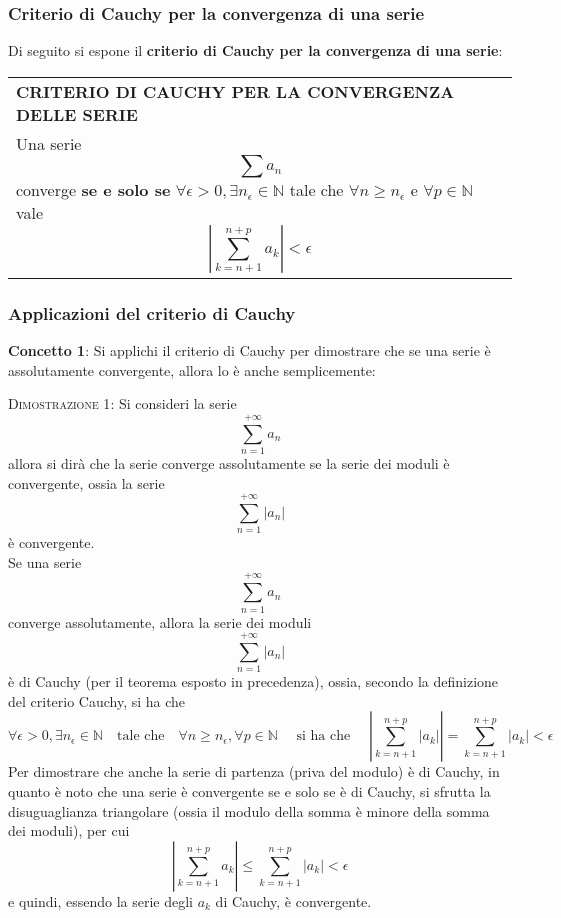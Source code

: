 \documentclass[a4paper]{extarticle}
\renewcommand\arraystretch{}
\begin{document}
\newpage
\noindent
\subsubsection{Criterio di Cauchy per la convergenza di una serie}
Di seguito si espone il \textbf{criterio di Cauchy per la convergenza di una serie}:

\vspace{1em}
\setlength{\tabcolsep}{14pt}
\renewcommand{\arraystretch}{2}
\noindent
\begin{tabularx}{\textwidth}{@{}|P|@{}}
    \hline
    {\textbf{CRITERIO DI CAUCHY PER LA CONVERGENZA DELLE SERIE}}\\
    \parbox{\linewidth}{Una serie
    \[\sum a_n\]
    converge \textbf{se e solo se} $\forall \epsilon > 0, \exists n_\epsilon \in \mathbb{N}$ tale che $\forall n \geq n_\epsilon$ e $\forall p \in \mathbb{N}$ vale
    \[\left \vert \sum_{k=n+1}^{n+p} a_k \right \vert < \epsilon\]
    \vspace{-1mm}}\\
    \hline
\end{tabularx}

\vspace{1em}
\noindent
\subsubsection{Applicazioni del criterio di Cauchy}
\textbf{Concetto 1}: Si applichi il criterio di Cauchy per dimostrare che se una serie è assolutamente convergente, allora lo è anche semplicemente:

\vspace{2em}
\noindent
\normalfont \normalsize
\textsc{Dimostrazione 1}: Si consideri la serie
\[\sum_{n=1}^{+\infty} a_n\]
allora si dirà che la serie converge assolutamente se la serie dei moduli è convergente, ossia la serie
\[\sum_{n=1}^{+\infty} \left \vert a_n \right \vert\]
è convergente.\\
Se una serie
\[\sum_{n=1}^{+\infty} a_n\]
converge assolutamente, allora la serie dei moduli
\[\sum_{n=1}^{+\infty} \left \vert a_n \right \vert\]
è di Cauchy (per il teorema esposto in precedenza), ossia, secondo la definizione del criterio Cauchy, si ha che
\[\forall \epsilon > 0, \exists n_\epsilon \in \mathbb{N} \hspace{1em} \text{tale che} \hspace{1em} \forall n \geq n_\epsilon, \forall p \in \mathbb{N} \hspace{1em} \text{ si ha che } \hspace{1em} \left \vert \sum_{k=n+1}^{n+p} \left \vert a_k \right \vert \right \vert= \sum_{k=n+1}^{n+p} \left \vert a_k \right \vert < \epsilon\]
Per dimostrare che anche la serie di partenza (priva del modulo) è di Cauchy, in quanto è noto che una serie è convergente se e solo se è di Cauchy, si sfrutta la disuguaglianza triangolare (ossia il modulo della somma è minore della somma dei moduli), per cui
\[\left \vert \sum_{k=n+1}^{n+p} a_k \right \vert \leq \sum_{k=n+1}^{n+p} \vert a_k \vert < \epsilon\]
e quindi, essendo la serie degli $a_k$ di Cauchy, è convergente.
\end{document}
